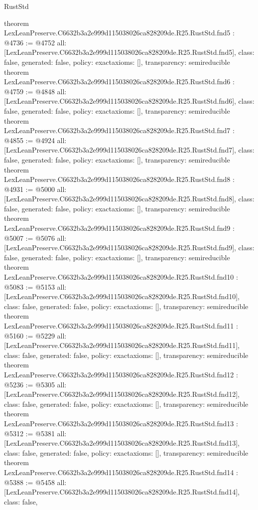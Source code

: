 \begin{lexlean}{RustStd}
\begin{coremodule}
{}
theorem LexLeanPreserve.C6632b3a2e999d115038026ca828209de.R25.RustStd.fnd5 : @4736 := @4752 {
  all: [LexLeanPreserve.C6632b3a2e999d115038026ca828209de.R25.RustStd.fnd5],
  class: false,
  generated: false,
  policy: exact{axioms: []},
  transparency: semireducible
}
theorem LexLeanPreserve.C6632b3a2e999d115038026ca828209de.R25.RustStd.fnd6 : @4759 := @4848 {
  all: [LexLeanPreserve.C6632b3a2e999d115038026ca828209de.R25.RustStd.fnd6],
  class: false,
  generated: false,
  policy: exact{axioms: []},
  transparency: semireducible
}
theorem LexLeanPreserve.C6632b3a2e999d115038026ca828209de.R25.RustStd.fnd7 : @4855 := @4924 {
  all: [LexLeanPreserve.C6632b3a2e999d115038026ca828209de.R25.RustStd.fnd7],
  class: false,
  generated: false,
  policy: exact{axioms: []},
  transparency: semireducible
}
theorem LexLeanPreserve.C6632b3a2e999d115038026ca828209de.R25.RustStd.fnd8 : @4931 := @5000 {
  all: [LexLeanPreserve.C6632b3a2e999d115038026ca828209de.R25.RustStd.fnd8],
  class: false,
  generated: false,
  policy: exact{axioms: []},
  transparency: semireducible
}
theorem LexLeanPreserve.C6632b3a2e999d115038026ca828209de.R25.RustStd.fnd9 : @5007 := @5076 {
  all: [LexLeanPreserve.C6632b3a2e999d115038026ca828209de.R25.RustStd.fnd9],
  class: false,
  generated: false,
  policy: exact{axioms: []},
  transparency: semireducible
}
theorem LexLeanPreserve.C6632b3a2e999d115038026ca828209de.R25.RustStd.fnd10 : @5083 := @5153 {
  all: [LexLeanPreserve.C6632b3a2e999d115038026ca828209de.R25.RustStd.fnd10],
  class: false,
  generated: false,
  policy: exact{axioms: []},
  transparency: semireducible
}
theorem LexLeanPreserve.C6632b3a2e999d115038026ca828209de.R25.RustStd.fnd11 : @5160 := @5229 {
  all: [LexLeanPreserve.C6632b3a2e999d115038026ca828209de.R25.RustStd.fnd11],
  class: false,
  generated: false,
  policy: exact{axioms: []},
  transparency: semireducible
}
theorem LexLeanPreserve.C6632b3a2e999d115038026ca828209de.R25.RustStd.fnd12 : @5236 := @5305 {
  all: [LexLeanPreserve.C6632b3a2e999d115038026ca828209de.R25.RustStd.fnd12],
  class: false,
  generated: false,
  policy: exact{axioms: []},
  transparency: semireducible
}
theorem LexLeanPreserve.C6632b3a2e999d115038026ca828209de.R25.RustStd.fnd13 : @5312 := @5381 {
  all: [LexLeanPreserve.C6632b3a2e999d115038026ca828209de.R25.RustStd.fnd13],
  class: false,
  generated: false,
  policy: exact{axioms: []},
  transparency: semireducible
}
theorem LexLeanPreserve.C6632b3a2e999d115038026ca828209de.R25.RustStd.fnd14 : @5388 := @5458 {
  all: [LexLeanPreserve.C6632b3a2e999d115038026ca828209de.R25.RustStd.fnd14],
  class: false,
}
\end{coremodule}
\end{lexlean}
